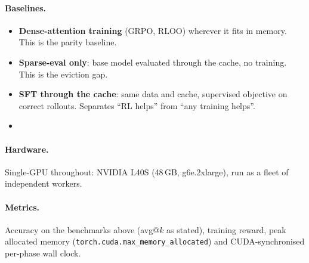 \paragraph{Baselines.}
\begin{itemize}
  \item \textbf{Dense-attention training} (GRPO, RLOO) wherever it fits in
    memory. This is the parity baseline.
  \item \textbf{Sparse-eval only}: base model evaluated through the cache, no
    training. This is the eviction gap.
  \item \textbf{SFT through the cache}: same data and cache, supervised
    objective on correct rollouts. Separates ``RL helps'' from ``any training
    helps''.
  \item {}
\end{itemize}

\paragraph{Hardware.}
Single-GPU throughout: NVIDIA L40S (48\,GB, g6e.2xlarge), run as a fleet of
independent workers. 

\paragraph{Metrics.}
Accuracy on the benchmarks above (avg@$k$ as stated), training reward, peak
allocated memory (\texttt{torch.cuda.max\_memory\_allocated}) and
CUDA-synchronised per-phase wall clock.
